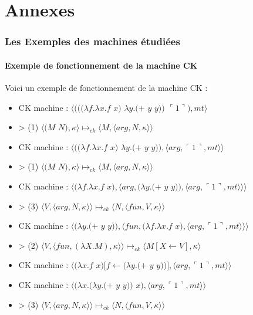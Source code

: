 \documentclass[10pt,a4paper]{report}
\begin{document}
\chapter*{Annexes}

\subsection{Les Exemples des machines étudiées}

\subsubsection{Exemple de fonctionnement de la machine CK}\label{CK}

Voici un exemple de fonctionnement de la machine CK :

\begin{itemize}
\item[] CK machine : $\langle(((\lambda f.\lambda x.f$ $x)$ $\lambda y.(+$ $y$ $y))$ $\ulcorner 1\urcorner),mt\rangle$
\item[] > (1) $\langle(M$ $N),\kappa\rangle \longmapsto_{ck} \langle M,\langle arg,N,\kappa\rangle\rangle$
\item[] CK machine : $\langle((\lambda f.\lambda x.f$ $x)$ $\lambda y.(+$ $y$ $y)),\langle arg,\ulcorner 1\urcorner,mt\rangle\rangle$
\item[] > (1) $\langle(M$ $N),\kappa\rangle \longmapsto_{ck} \langle M,\langle arg,N,\kappa\rangle\rangle$
\item[] CK machine : $\langle(\lambda f.\lambda x.f$ $x),\langle arg,(\lambda y.(+$ $y$ $y)),\langle arg,\ulcorner 1\urcorner,mt\rangle\rangle\rangle$	
\item[] > (3) $\langle V,\langle arg,N,\kappa \rangle \rangle \longmapsto_{ck} \langle N,\langle fun,V,\kappa \rangle \rangle$
\item[] CK machine : $\langle(\lambda y.(+$ $y$ $y)),\langle fun,(\lambda f.\lambda x.f$ $x),\langle arg,\ulcorner 1\urcorner,mt\rangle\rangle\rangle$	
\item[] > (2) $\langle V,\langle fun,(\lambda X.M),\kappa \rangle \rangle \longmapsto_{ck} \langle M[X \leftarrow V],\kappa\rangle$
\item[] CK machine : $\langle(\lambda x.f$ $x)[f\leftarrow(\lambda y.(+$ $y$ $y))],\langle arg,\ulcorner 1\urcorner,mt\rangle\rangle$	
\item[] CK machine : $\langle(\lambda x.(\lambda y.(+$ $y$ $y))$ $x),\langle arg,\ulcorner 1\urcorner,mt\rangle\rangle$	
\item[] > (3) $\langle V,\langle arg,N,\kappa \rangle \rangle \longmapsto_{ck} \langle N,\langle fun,V,\kappa \rangle \rangle$

\end{itemize}
\end{document}
